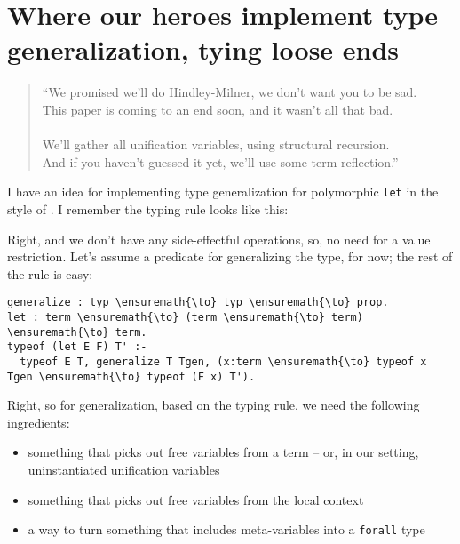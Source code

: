 \section{Where our heroes implement type generalization, tying loose
ends}\label{where-our-heroes-implement-type-generalization-tying-loose-ends}

\begin{verse}
``We promised we'll do Hindley-Milner, we don't want you to be sad. \\
This paper is coming to an end soon, and it wasn't all that bad. \\
\hspace{1em}\vspace{-0.5em} \\
We'll gather all unification variables, using structural recursion. \\
And if you haven't guessed it yet, we'll use some term reflection.''
\end{verse}

\heroSTUDENT{} I have an idea for implementing type generalization for
polymorphic \texttt{let} in the style of
\citet{damas1984type,hindley1969principal,milner1978theory}. I remember
the typing rule looks like this:

\vspace{-1.2em}\begin{mathpar}
\end{mathpar}

\heroADVISOR{} Right, and we don't have any side-effectful operations, so, no
need for a value restriction. Let's assume a predicate for generalizing
the type, for now; the rest of the rule is easy:

\begin{verbatim}
generalize : typ \ensuremath{\to} typ \ensuremath{\to} prop.
let : term \ensuremath{\to} (term \ensuremath{\to} term) \ensuremath{\to} term.
typeof (let E F) T' :-
  typeof E T, generalize T Tgen, (x:term \ensuremath{\to} typeof x Tgen \ensuremath{\to} typeof (F x) T').
\end{verbatim}

\heroSTUDENT{} Right, so for generalization, based on the typing rule, we need
the following ingredients:

\begin{itemize}
\tightlist
\item
  something that picks out free variables from a term -- or, in our
  setting, uninstantiated unification variables
\item
  something that picks out free variables from the local context
\item
  a way to turn something that includes meta-variables into a
  \texttt{forall} type
\end{itemize}

